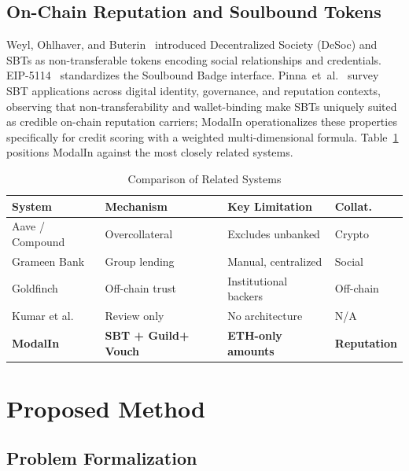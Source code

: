 \documentclass[conference]{IEEEtran}
\begin{document}
\subsection{On-Chain Reputation and Soulbound Tokens}

Weyl, Ohlhaver, and Buterin~\cite{b1} introduced Decentralized Society
(DeSoc) and SBTs as non-transferable tokens encoding social relationships
and credentials. EIP-5114~\cite{b12} standardizes the Soulbound Badge
interface. Pinna~et~al.~\cite{b22} survey SBT applications across digital identity,
governance, and reputation contexts, observing that non-transferability and
wallet-binding make SBTs uniquely suited as credible on-chain reputation
carriers; ModalIn operationalizes these properties specifically for credit
scoring with a weighted multi-dimensional formula.
Table~\ref{tab:related} positions ModalIn against the most closely related
systems.

\begin{table}[t]
\caption{Comparison of Related Systems}
\label{tab:related}
\centering
{\small
\setlength{\tabcolsep}{3pt}
\begin{tabular}{p{1.6cm}p{1.9cm}p{2.3cm}p{1.2cm}}
\toprule
\textbf{System} & \textbf{Mechanism} & \textbf{Key Limitation} & \textbf{Collat.} \\
\midrule
Aave / Compound & Overcollateral   & Excludes unbanked      & Crypto \\
Grameen Bank  & Group lending    & Manual, centralized    & Social \\
Goldfinch     & Off-chain trust  & Institutional backers  & Off-chain \\
Kumar et al.  & Review only      & No architecture        & N/A \\
\textbf{ModalIn} & \textbf{SBT + Guild}\newline\textbf{+ Vouch} & \textbf{ETH-only amounts} & \textbf{Reputation} \\
\bottomrule
\end{tabular}}
\end{table}

\section{Proposed Method}

\subsection{Problem Formalization}
\end{document}
